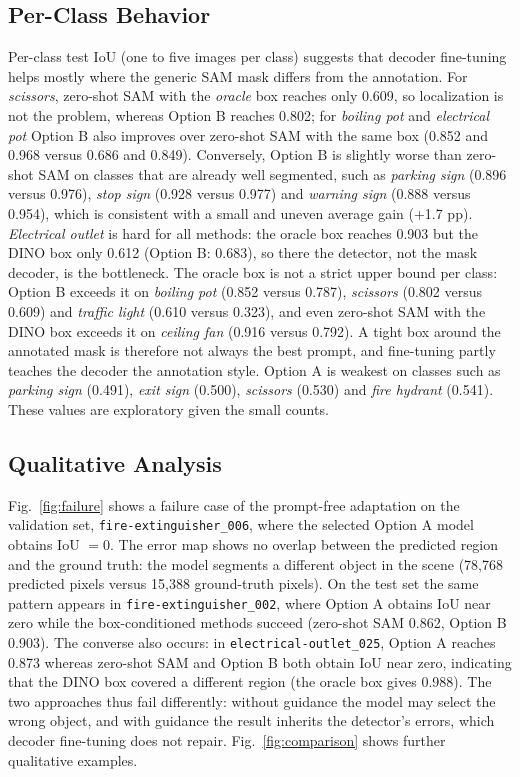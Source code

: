 \documentclass[conference]{IEEEtran}
\begin{document}
\subsection{Per-Class Behavior}

Per-class test IoU (one to five images per class) suggests that decoder fine-tuning helps mostly where the generic SAM mask differs from the annotation. For \emph{scissors}, zero-shot SAM with the \emph{oracle} box reaches only 0.609, so localization is not the problem, whereas Option B reaches 0.802; for \emph{boiling pot} and \emph{electrical pot} Option B also improves over zero-shot SAM with the same box (0.852 and 0.968 versus 0.686 and 0.849). Conversely, Option B is slightly worse than zero-shot SAM on classes that are already well segmented, such as \emph{parking sign} (0.896 versus 0.976), \emph{stop sign} (0.928 versus 0.977) and \emph{warning sign} (0.888 versus 0.954), which is consistent with a small and uneven average gain (+1.7 pp). \emph{Electrical outlet} is hard for all methods: the oracle box reaches 0.903 but the DINO box only 0.612 (Option B: 0.683), so there the detector, not the mask decoder, is the bottleneck. The oracle box is not a strict upper bound per class: Option B exceeds it on \emph{boiling pot} (0.852 versus 0.787), \emph{scissors} (0.802 versus 0.609) and \emph{traffic light} (0.610 versus 0.323), and even zero-shot SAM with the DINO box exceeds it on \emph{ceiling fan} (0.916 versus 0.792). A tight box around the annotated mask is therefore not always the best prompt, and fine-tuning partly teaches the decoder the annotation style. Option A is weakest on classes such as \emph{parking sign} (0.491), \emph{exit sign} (0.500), \emph{scissors} (0.530) and \emph{fire hydrant} (0.541). These values are exploratory given the small counts.

\subsection{Qualitative Analysis}

Fig.~\ref{fig:failure} shows a failure case of the prompt-free adaptation on the validation set, \texttt{fire-extinguisher\_006}, where the selected Option A model obtains IoU $=0$. The error map shows no overlap between the predicted region and the ground truth: the model segments a different object in the scene (78{,}768 predicted pixels versus 15{,}388 ground-truth pixels). On the test set the same pattern appears in \texttt{fire-extinguisher\_002}, where Option A obtains IoU near zero while the box-conditioned methods succeed (zero-shot SAM 0.862, Option B 0.903). The converse also occurs: in \texttt{electrical-outlet\_025}, Option A reaches 0.873 whereas zero-shot SAM and Option B both obtain IoU near zero, indicating that the DINO box covered a different region (the oracle box gives 0.988). The two approaches thus fail differently: without guidance the model may select the wrong object, and with guidance the result inherits the detector's errors, which decoder fine-tuning does not repair. Fig.~\ref{fig:comparison} shows further qualitative examples.
\end{document}
